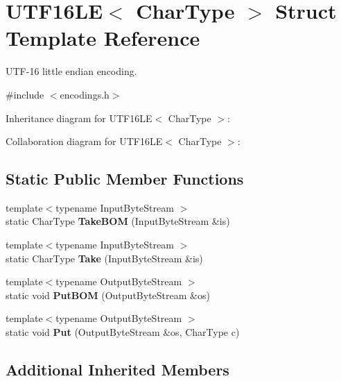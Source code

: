 \hypertarget{struct_u_t_f16_l_e}{}\section{U\+T\+F16\+LE$<$ Char\+Type $>$ Struct Template Reference}
\label{struct_u_t_f16_l_e}


U\+T\+F-\/16 little endian encoding.  




{\ttfamily \#include $<$encodings.\+h$>$}



Inheritance diagram for U\+T\+F16\+LE$<$ Char\+Type $>$\+:


Collaboration diagram for U\+T\+F16\+LE$<$ Char\+Type $>$\+:
\subsection*{Static Public Member Functions}
\begin{DoxyCompactItemize}
\item 
\mbox{\label{struct_u_t_f16_l_e_ab1d5f43903815155796733f76b21deea}} 
{\footnotesize template$<$typename Input\+Byte\+Stream $>$ }\\static Char\+Type {\bfseries Take\+B\+OM} (Input\+Byte\+Stream \&is)
\item 
\mbox{\label{struct_u_t_f16_l_e_a5927b3d75ff9ce02056d827c14bd0160}} 
{\footnotesize template$<$typename Input\+Byte\+Stream $>$ }\\static Char\+Type {\bfseries Take} (Input\+Byte\+Stream \&is)
\item 
\mbox{\label{struct_u_t_f16_l_e_a6bfd05f8cac35c1594c7fce47009f198}} 
{\footnotesize template$<$typename Output\+Byte\+Stream $>$ }\\static void {\bfseries Put\+B\+OM} (Output\+Byte\+Stream \&os)
\item 
\mbox{\label{struct_u_t_f16_l_e_ac018cc43a1dba5a6ca232bd9a257072c}} 
{\footnotesize template$<$typename Output\+Byte\+Stream $>$ }\\static void {\bfseries Put} (Output\+Byte\+Stream \&os, Char\+Type c)
\end{DoxyCompactItemize}
\subsection*{Additional Inherited Members}


